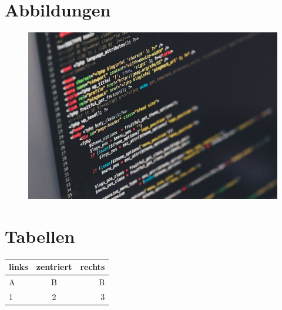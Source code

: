 \section{Abbildungen}
\begin{figure}[h!]                                                                  %
    \centering                                                                      %
    \includegraphics[width=.9\linewidth]{ba_abbildungen/testimage}                  %
\end{figure}

\section{Tabellen}
\begin{table}[h!]                                                                   %
    \centering                                                                      %
    \begin{tabular}{l|c|r}\hline\hline                                              %
        links & zentriert & rechts \\\hline A & B & B\\\cline{2-2}                  %
        1 & 2 & 3\\\hline
    \end{tabular}
\end{table} 

\newpage